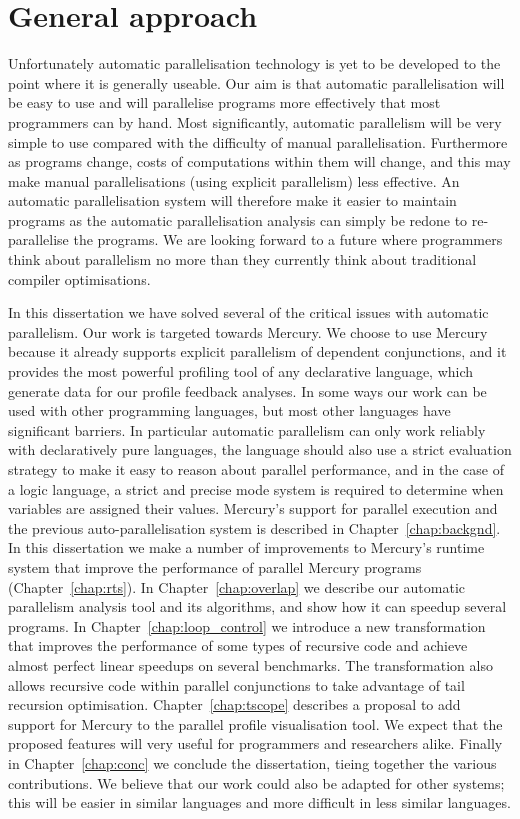 

\section{General approach}
\label{sec:intro_general_approach}

Unfortunately automatic parallelisation technology is yet to be developed to the
point where it is generally useable.
Our aim is that automatic parallelisation will be easy to use and
will parallelise programs more effectively that most programmers can by
hand.
Most significantly,
automatic parallelism will be very simple to use compared with the
difficulty of manual parallelisation.
Furthermore as programs change,
costs of computations within them will change,
and this may make manual parallelisations (using explicit parallelism) less
effective.
An automatic parallelisation system will therefore make it easier to
maintain programs as the automatic parallelisation analysis can simply be
redone to re-parallelise the programs.
We are looking forward to a future where programmers think about
parallelism no more than they currently think about traditional compiler
optimisations.

In this dissertation we have solved several of the critical issues with
automatic parallelism.
Our work is targeted towards Mercury.
We choose to use Mercury because
it already supports explicit parallelism of dependent conjunctions,
and it provides the most powerful profiling tool of any declarative language,
which generate data for our profile feedback analyses.
In some ways our work can be used with other programming languages,
but most other languages have significant barriers.
In particular automatic parallelism can only work reliably with declaratively
pure languages,
the language should also use a strict evaluation strategy to make it easy to
reason about parallel performance,
and in the case of a logic language, a strict and precise mode system is
required to determine when variables are assigned their values.
Mercury's support for parallel execution and the previous
auto-parallelisation system \citep{bone:2008:hons} is described in
Chapter~\ref{chap:backgnd}.
In this dissertation we make a number of improvements to Mercury's runtime
system that improve the performance of parallel Mercury programs
(Chapter~\ref{chap:rts}).
In Chapter~\ref{chap:overlap} we describe our
automatic parallelism analysis tool and its algorithms,
and show how it can speedup several programs.
In Chapter~\ref{chap:loop_control} we introduce a new transformation that
improves the performance of 
some types of recursive code and achieve almost perfect linear speedups on
several benchmarks.
The transformation also allows recursive code within parallel conjunctions
to take advantage of tail recursion optimisation.
Chapter~\ref{chap:tscope} describes a proposal to add support for Mercury to
the \tscope parallel profile visualisation tool.
We expect that the proposed features will very useful for programmers and
researchers alike.
Finally in Chapter~\ref{chap:conc} we conclude the dissertation,
tieing together the various contributions.
We believe that our work could also be adapted for other systems;
this will be easier in similar languages and more difficult in less similar
languages.

